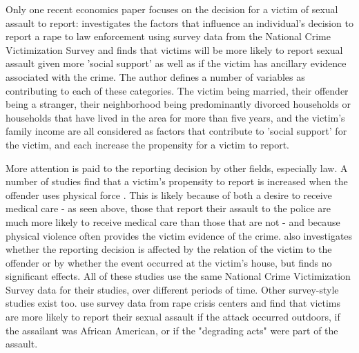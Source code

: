 \documentclass[AER,draftmode]{AEA}
\begin{document}
Only one recent economics paper focuses on the decision for a victim of sexual assault to report:  investigates the factors that influence an individual's decision to report a rape to law enforcement using survey data from the National Crime Victimization Survey and finds that victims will be more likely to report sexual assault given more 'social support' as well as if the victim has ancillary evidence associated with the crime. The author defines a number of variables as contributing to each of these categories. The victim being married, their offender being a stranger, their neighborhood being predominantly divorced households or households that have lived in the area for more than five years, and the victim's family income are all considered as factors that contribute to 'social support' for the victim, and each increase the propensity for a victim to report.

More attention is paid to the reporting decision by other fields, especially law. A number of studies find that a victim's propensity to report is increased when the offender uses physical force \cite{bachman_predicting_1993,du_mont_role_2003}. This is likely because of both a desire to receive medical care - as seen above, those that report their assault to the police are much more likely to receive medical care than those that are not - and because physical violence often provides the victim evidence of the crime.  also investigates whether the reporting decision is affected by the relation of the victim to the offender or by whether the event occurred at the victim's house, but finds no significant effects. All of these studies use the same National Crime Victimization Survey data for their studies, over different periods of time. Other survey-style studies exist too.  use survey data from rape crisis centers and find that victims are more likely to report their sexual assault if the attack occurred outdoors, if the assailant was African American, or if the "degrading acts" were part of the assault. 
\end{document}
